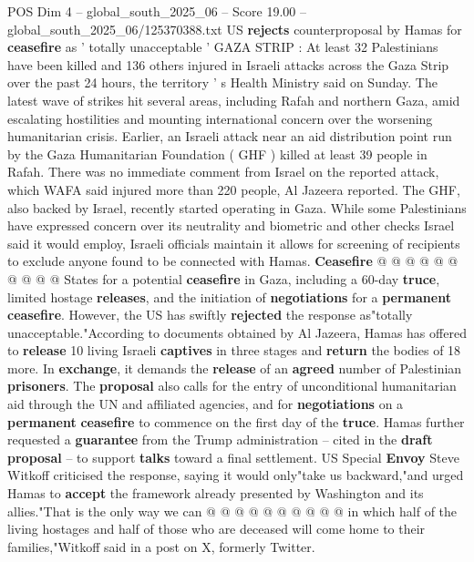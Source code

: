 \begin{textsample}{POS Dim 4 – global\_south\_2025\_06 – Score 19.00 – global\_south\_2025\_06/125370388.txt}  \label{ex:f4_pos_357}
US \textbf{rejects} counterproposal by Hamas for \textbf{ceasefire} as ' totally unacceptable ' GAZA STRIP : At least 32 Palestinians have been killed and 136 others injured in Israeli attacks across the Gaza Strip over the past 24 hours, the territory ' s Health Ministry said on Sunday.
The latest wave of strikes hit several areas, including Rafah and northern Gaza, amid escalating hostilities and mounting international concern over the worsening humanitarian crisis.
Earlier, an Israeli attack near an aid distribution point run by the Gaza Humanitarian Foundation ( GHF ) killed at least 39 people in Rafah.
There was no immediate comment from Israel on the reported attack, which WAFA said injured more than 220 people, Al Jazeera reported.
The GHF, also backed by Israel, recently started operating in Gaza.
While some Palestinians have expressed concern over its neutrality and biometric and other checks Israel said it would employ, Israeli officials maintain it allows for screening of recipients to exclude anyone found to be connected with Hamas. \textbf{Ceasefire} @ @ @ @ @ @ @ @ @ @ States for a potential \textbf{ceasefire} in Gaza, including a 60-day \textbf{truce}, limited hostage \textbf{releases}, and the initiation of \textbf{negotiations} for a \textbf{permanent} \textbf{ceasefire}.
However, the US has swiftly \textbf{rejected} the response as"totally unacceptable."According to documents obtained by Al Jazeera, Hamas has offered to \textbf{release} 10 living Israeli \textbf{captives} in three stages and \textbf{return} the bodies of 18 more.
In \textbf{exchange}, it demands the \textbf{release} of an \textbf{agreed} number of Palestinian \textbf{prisoners}.
The \textbf{proposal} also calls for the entry of unconditional humanitarian aid through the UN and affiliated agencies, and for \textbf{negotiations} on a \textbf{permanent} \textbf{ceasefire} to commence on the first day of the \textbf{truce}.
Hamas further requested a \textbf{guarantee} from the Trump administration -- cited in the \textbf{draft} \textbf{proposal} -- to support \textbf{talks} toward a final settlement.
US Special \textbf{Envoy} Steve Witkoff criticised the response, saying it would only"take us backward,"and urged Hamas to \textbf{accept} the framework already presented by Washington and its allies."That is the only way we can @ @ @ @ @ @ @ @ @ @ in which half of the living hostages and half of those who are deceased will come home to their families,"Witkoff said in a post on X, formerly Twitter.

\end{textsample}
